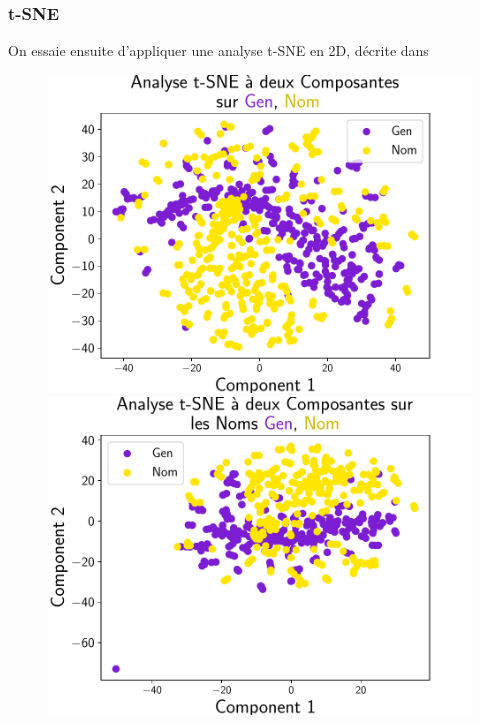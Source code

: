 \documentclass{cours}
\begin{document}
\subsubsection{t-SNE}
On essaie ensuite d'appliquer une analyse t-SNE en 2D, décrite dans~\cite{tSNE}
\begin{figure}[H]

\begin{center}
\begin{minipage}{.5\textwidth}
	\begin{center}
	\includegraphics[width=\linewidth]{Figures/Visualisations/tsne_Gen_Nom.pdf}
	\end{center}
\end{minipage}
\end{center}

\begin{minipage}{.5\textwidth}
	\begin{center}
	\includegraphics[width=\linewidth]{Figures/Visualisations/tsne_Gen_Nom_Nouns.pdf}
	\end{center}
\end{minipage}


\end{figure}
\end{document}
